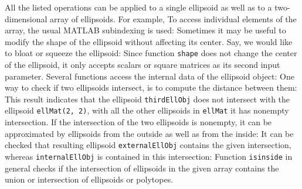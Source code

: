 All the listed operations can be applied to a single ellipsoid as well as to
a two-dimensional array of ellipsoids.
For example,
To access individual elements of the array, the usual MATLAB subindexing
is used:
Sometimes it may be useful to modify the shape of the ellipsoid without
affecting its center. Say, we would like to bloat or squeeze the ellipsoid:
Since function {\tt shape} does not change the center of the ellipsoid,
it only accepts scalars or square matrices as its second input parameter.
Several functions  access the internal data of
the ellipsoid object:
One way to check if two ellipsoids intersect, is to compute
the distance between them:
This result indicates that the ellipsoid {\tt thirdEllObj} does not intersect with
the ellipsoid {\tt ellMat(2, 2)}, with all the other ellipsoids in {\tt ellMat}
it has nonempty intersection. If the intersection of the two ellipsoids is
nonempty, it can be approximated by ellipsoids from the outside as well as
from the inside:
It can be checked that resulting ellipsoid {\tt externalEllObj} contains the given
intersection, whereas {\tt internalEllObj} is contained in this intersection:
Function {\tt isinside} in general checks if the intersection of ellipsoids
in the given array contains the union or intersection of ellipsoids or
polytopes.

